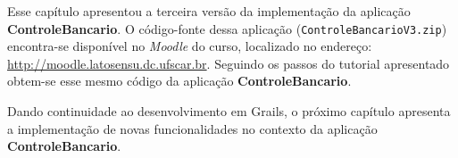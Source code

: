 \vspace{0.3cm}

Esse capítulo  apresentou a terceira  versão da implementação da  aplicação {\bf
  ControleBancario}.         O        código-fonte        dessa        aplicação
({\footnotesize\texttt{ControleBancarioV3.zip}}) encontra-se  disponível no {\it
  Moodle}         do        curso,        localizado         no        endereço:
{\footnotesize\url{http://moodle.latosensu.dc.ufscar.br}}. Seguindo os passos do
tutorial   apresentado   obtem-se   esse   mesmo  código   da   aplicação   {\bf
  ControleBancario}.  

Dando continuidade ao desenvolvimento em  Grails, o próximo capítulo apresenta a
implementação   de  novas   funcionalidades  no   contexto  da   aplicação  {\bf
  ControleBancario}.
